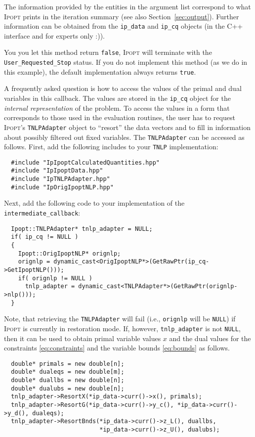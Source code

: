\documentclass[10pt]{article}
\newcommand{\Ipopt}{\textsc{Ipopt}\xspace}
\begin{document}
The information provided by the entities in the argument list
correspond to what \Ipopt prints in the iteration summary (see also
Section~\ref{sec:output}).  Further information can be obtained from
the {\tt ip\_data} and {\tt ip\_cq} objects (in the C++ interface and for experts only :)).

You you let this method return {\tt false}, \Ipopt will terminate
with the {\tt User\_Requested\_Stop} status.  If you do not implement
this method (as we do in this example), the default implementation
always returns {\tt true}.

A frequently asked question is how to access the values of the primal and dual variables in this callback. The values are stored in the {\tt ip\_cq} object for the \emph{internal representation} of the problem.
To access the values in a form that corresponds to those used in the evaluation routines, the user has to request \Ipopt's {\tt TNLPAdapter} object to ``resort'' the data vectors and to fill in information about possibly filtered out fixed variables.
The {\tt TNLPAdapter} can be accessed as follows.
First, add the following includes to your {\tt TNLP} implementation:
\begin{verbatim}
  #include "IpIpoptCalculatedQuantities.hpp"
  #include "IpIpoptData.hpp"
  #include "IpTNLPAdapter.hpp"
  #include "IpOrigIpoptNLP.hpp"
\end{verbatim}
Next, add the following code to your implementation of the {\tt intermediate\_callback}:
\begin{verbatim}
  Ipopt::TNLPAdapter* tnlp_adapter = NULL;
  if( ip_cq != NULL )
  {
    Ipopt::OrigIpoptNLP* orignlp;
    orignlp = dynamic_cast<OrigIpoptNLP*>(GetRawPtr(ip_cq->GetIpoptNLP()));
    if( orignlp != NULL )
      tnlp_adapter = dynamic_cast<TNLPAdapter*>(GetRawPtr(orignlp->nlp()));
  }
\end{verbatim}
Note, that retrieving the {\tt TNLPAdapter} will fail (i.e., {\tt orignlp} will be {\tt NULL}) if \Ipopt is currently in restoration mode.
If, however, {\tt tnlp\_adapter} is not {\tt NULL}, then it can be used to obtain primal variable values $x$ and the dual values for the constraints \ref{eq:constraints} and the variable bounds \ref{eq:bounds} as follows.
\begin{verbatim}
  double* primals = new double[n];
  double* dualeqs = new double[m];
  double* duallbs = new double[n];
  double* dualubs = new double[n];
  tnlp_adapter->ResortX(*ip_data->curr()->x(), primals);
  tnlp_adapter->ResortG(*ip_data->curr()->y_c(), *ip_data->curr()->y_d(), dualeqs);
  tnlp_adapter->ResortBnds(*ip_data->curr()->z_L(), duallbs,
                           *ip_data->curr()->z_U(), dualubs);
\end{verbatim}
\end{document}

